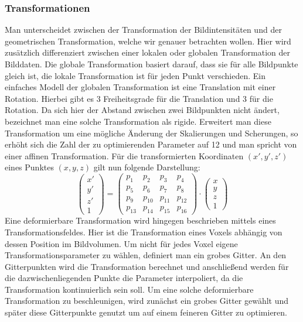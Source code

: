 \subsubsection{Transformationen}
Man unterscheidet zwischen der Transformation der Bildintensitäten und der
geometrischen Transformation, welche wir genauer betrachten wollen. Hier wird
zusätzlich differenziert zwischen einer lokalen oder globalen Transformation
der Bilddaten. Die globale Transformation basiert darauf, dass sie für alle
Bildpunkte gleich ist, die lokale Transformation ist für jeden Punkt
verschieden. Ein einfaches Modell der globalen Transformation ist eine
Translation mit einer Rotation. Hierbei gibt es 3 Freiheitsgrade für die
Translation und 3 für die Rotation. Da sich hier der Abstand zwischen zwei
Bildpunkten nicht ändert, bezeichnet man eine solche Transformation als rigide.
Erweitert man diese Transformation um eine mögliche Änderung der Skalierungen
und Scherungen, so erhöht sich die Zahl der zu optimierenden Parameter auf 12
und man spricht von einer affinen Transformation. Für die transformierten
Koordinaten $(x',y',z')$ eines Punktes $(x,y,z)$ gilt nun folgende Darstellung:
\begin{equation}
  \begin{pmatrix}
    x' \\ y' \\ z' \\ 1
  \end{pmatrix}
  =
  \begin{pmatrix}
    p_1 & p_2 & p_3 & p_4 \\
    p_5 & p_6 & p_7 & p_8 \\
    p_9 & p_{10} & p_{11} & p_{12} \\
    p_{13} & p_{14} & p_{15} & p_{16}
  \end{pmatrix}
  \cdot
  \begin{pmatrix}
    x \\ y \\ z \\ 1
  \end{pmatrix}
\end{equation}
Eine deformierbare Transformation wird hingegen beschrieben mittels eines
Transformationsfeldes. Hier ist die Transformation eines Voxels abhängig von
dessen Position im Bildvolumen. Um nicht für jedes Voxel eigene
Transformationsparameter zu wählen, definiert man ein grobes Gitter. An den
Gitterpunkten wird die Transformation berechnet und anschließend werden für die
dazwischenliegenden Punkte die Parameter interpoliert, da die Transformation
kontinuierlich sein soll. Um eine solche deformierbare Transformation zu
beschleunigen, wird zunächst ein grobes Gitter gewählt und später diese
Gitterpunkte genutzt um auf einem feineren Gitter zu optimieren.
